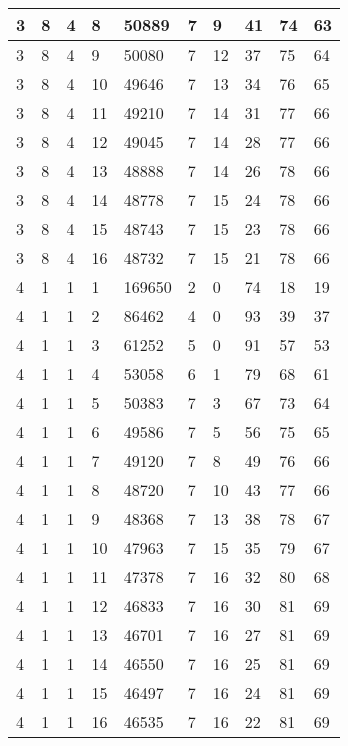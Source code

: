 \begin{table}[!ht]
\begin{tabular}{|l|l|l|l|l|l|l|l|l|l|}
        3 & 8 & 4 & 8 & 50889 & 7 & 9 & 41 & 74 & 63 \\ \hline
        3 & 8 & 4 & 9 & 50080 & 7 & 12 & 37 & 75 & 64 \\ \hline
        3 & 8 & 4 & 10 & 49646 & 7 & 13 & 34 & 76 & 65 \\ \hline
        3 & 8 & 4 & 11 & 49210 & 7 & 14 & 31 & 77 & 66 \\ \hline
        3 & 8 & 4 & 12 & 49045 & 7 & 14 & 28 & 77 & 66 \\ \hline
        3 & 8 & 4 & 13 & 48888 & 7 & 14 & 26 & 78 & 66 \\ \hline
        3 & 8 & 4 & 14 & 48778 & 7 & 15 & 24 & 78 & 66 \\ \hline
        3 & 8 & 4 & 15 & 48743 & 7 & 15 & 23 & 78 & 66 \\ \hline
        3 & 8 & 4 & 16 & 48732 & 7 & 15 & 21 & 78 & 66 \\ \hline
        4 & 1 & 1 & 1 & 169650 & 2 & 0 & 74 & 18 & 19 \\ \hline
        4 & 1 & 1 & 2 & 86462 & 4 & 0 & 93 & 39 & 37 \\ \hline
        4 & 1 & 1 & 3 & 61252 & 5 & 0 & 91 & 57 & 53 \\ \hline
        4 & 1 & 1 & 4 & 53058 & 6 & 1 & 79 & 68 & 61 \\ \hline
        4 & 1 & 1 & 5 & 50383 & 7 & 3 & 67 & 73 & 64 \\ \hline
        4 & 1 & 1 & 6 & 49586 & 7 & 5 & 56 & 75 & 65 \\ \hline
        4 & 1 & 1 & 7 & 49120 & 7 & 8 & 49 & 76 & 66 \\ \hline
        4 & 1 & 1 & 8 & 48720 & 7 & 10 & 43 & 77 & 66 \\ \hline
        4 & 1 & 1 & 9 & 48368 & 7 & 13 & 38 & 78 & 67 \\ \hline
        4 & 1 & 1 & 10 & 47963 & 7 & 15 & 35 & 79 & 67 \\ \hline
        4 & 1 & 1 & 11 & 47378 & 7 & 16 & 32 & 80 & 68 \\ \hline
        4 & 1 & 1 & 12 & 46833 & 7 & 16 & 30 & 81 & 69 \\ \hline
        4 & 1 & 1 & 13 & 46701 & 7 & 16 & 27 & 81 & 69 \\ \hline
        4 & 1 & 1 & 14 & 46550 & 7 & 16 & 25 & 81 & 69 \\ \hline
        4 & 1 & 1 & 15 & 46497 & 7 & 16 & 24 & 81 & 69 \\ \hline
        4 & 1 & 1 & 16 & 46535 & 7 & 16 & 22 & 81 & 69 \\ \hline

\end{tabular}
\end{table}
